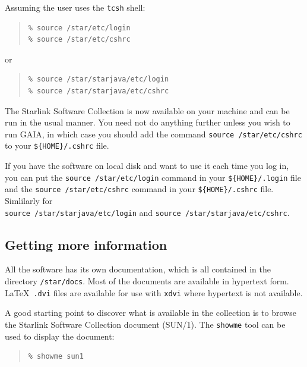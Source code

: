 \documentclass[twoside,11pt]{article}
\newcommand{\xref}[3]{#1}
\newcommand{\xlabel}[1]{}
\renewcommand{\_}{\texttt{\symbol{95}}}
\begin{document}
Assuming the user uses the \texttt{tcsh} shell:

\begin{quote}
\begin{verbatim}
% source /star/etc/login
% source /star/etc/cshrc
\end{verbatim}
\end{quote}

or 

\begin{quote}
\begin{verbatim}
% source /star/starjava/etc/login
% source /star/starjava/etc/cshrc
\end{verbatim}
\end{quote}



The Starlink Software Collection is now available on your machine and
can be run in the usual manner.   You need not do anything further unless
you wish to run GAIA, in which case you should add the command 
\texttt{source /star/etc/cshrc} to your \verb+${HOME}/.cshrc+ file.

If you have the software on local disk and want to use it each time you 
log in, you can put the \texttt{source /star/etc/login} command in your 
\verb+${HOME}/.login+ file and the \texttt{source /star/etc/cshrc}
command in your \verb+${HOME}/.cshrc+ file. Simlilarly for \\
\texttt{source /star/starjava/etc/login} and 
\texttt{source /star/starjava/etc/cshrc}.

\subsection{\xlabel{getting_more_information}Getting more information}
\label{getting_more_information}

All the software has its own documentation, which is all contained in the
directory \texttt{/star/docs}.  Most of the documents are available in
hypertext form.  \LaTeX\ \texttt{.dvi} files are available for use with
\texttt{xdvi} where hypertext is not available.  

A good starting point to discover what is available in the collection
is to browse the \xref{Starlink Software Collection}{sun1}{} document
(SUN/1).  The \texttt{showme} tool can be used to display the
document:

\begin{quote}
\begin{verbatim}
% showme sun1
\end{verbatim}
\end{quote}
\end{document}
